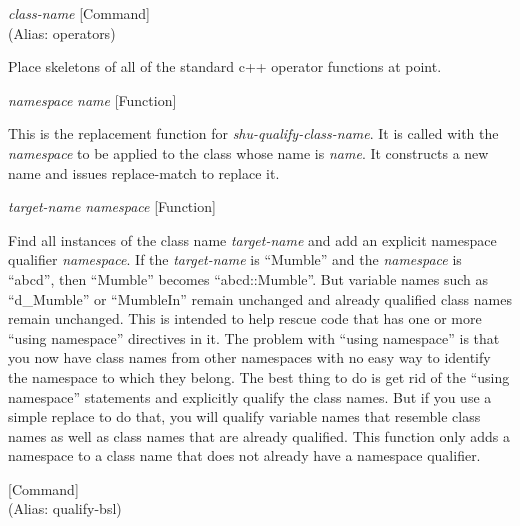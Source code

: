 \vspace{1em}
\noindent
{}
\usebox{\funcname}\emph{class-name}
 \hfill [Command]\\%
 (Alias: operators)

\begin{doc-string}
Place skeletons of all of the standard c++ operator functions at point.
\end{doc-string}

\vspace{1em}
\noindent
{}
\usebox{\funcname}\emph{namespace} \emph{name}
 \hfill [Function]

\begin{doc-string}
This is the replacement function for \emph{shu-qualify-class-name}.  It is called
with the \emph{namespace} to be applied to the class whose name is \emph{name}.  It
constructs a new name and issues replace-match to replace it.
\end{doc-string}

\vspace{1em}
\noindent
{}
\usebox{\funcname}\emph{target-name} \emph{namespace}
 \hfill [Function]

\begin{doc-string}
Find all instances of the class name \emph{target-name} and add an explicit namespace
qualifier \emph{namespace}.  If the \emph{target-name} is ``Mumble'' and the \emph{namespace} is
``abcd'', then ``Mumble'' becomes ``abcd::Mumble''.  But variable names such
as ``d\_Mumble'' or ``MumbleIn'' remain unchanged and already qualified class
names remain unchanged.
This is intended to help rescue code that has one or more ``using namespace''
directives in it.  The problem with ``using namespace'' is that you now have
class names from other namespaces with no easy way to identify the namespace
to which they belong.  The best thing to do is get rid of the ``using
namespace'' statements and explicitly qualify the class names.  But if you
use a simple replace to do that, you will qualify variable names that resemble
class names as well as class names that are already qualified.  This function
only adds a namespace to a class name that does not already have a namespace
qualifier.
\end{doc-string}

\vspace{1em}
\noindent
{}
\usebox{\funcname}
 \hfill [Command]\\%
 (Alias: qualify-bsl)


